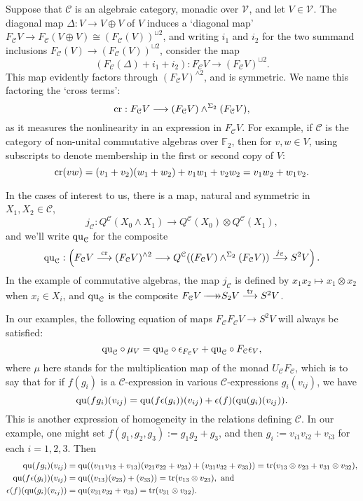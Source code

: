 \documentclass[11pt]{amsart}
\theoremstyle{plain}
\theoremstyle{definition}
\DeclareMathOperator{\trace}{tr}
\renewcommand{\to}{\longrightarrow}
\newcommand{\calC}{\mathcal{C}}
\newcommand{\calV}{\mathcal{V}}
\theoremstyle{plain}
\newcommand{\vect}[2]{\calV^{#1}_{#2}}
\newcommand{\quadratic}{\textup{qu}}
\newcommand{\crossterms}{\textup{cr}}
\newcommand{\epi}{{\,\makebox[0cm][l]{\ensuremath\to}\to}}
\newcommand{\F}{\mathbb{F}}
\begin{document}
\begin{Conventions and notation}
Suppose that $\calC$ is an algebraic category, monadic over $\vect{}{}$, and let $V\in\vect{}{}$. The diagonal map $\Delta:V\to V\oplus V$ of $V$ induces a `diagonal map' $F_\calC V\to F_\calC (V\oplus V)\cong (F_\calC (V))^{\sqcup 2}$, and writing $i_1$ and $i_2$ for the two summand inclusions $F_\calC (V)\to (F_\calC (V))^{\sqcup 2}$, consider the map
\[(F_\calC(\Delta)+i_1+i_2):F_\calC V\to (F_\calC V)^{\sqcup2}.\]
This map evidently factors through $(F_\calC V)^{\wedge 2}$, and is symmetric. We name this factoring the `cross terms':
\[\crossterms:F_\calC V\to (F_\calC V)\wedge^{\Sigma_2} (F_\calC V),\]
as it measures the nonlinearity in an expression in $F_\calC V$. For example, if $\calC$ is the category of non-unital commutative algebras over $\F_2$, then for $v,w\in V$, using subscripts to denote membership in the first or second copy of $V$:
\[\crossterms(vw)=(v_1+v_2)(w_1+w_2)+v_1w_1+v_2w_2=v_1w_2+w_1v_2.\]

In the cases of interest to us, there is a map, natural and symmetric in $X_1,X_2\in\calC$,
\[j_\calC:Q^\calC(X_0\wedge X_1)\to Q^\calC(X_0)\otimes Q^\calC(X_1),\]
and we'll write $\quadratic_\calC$ for the composite
\[\quadratic_\calC:\left(F_\calC V\overset{\crossterms}{\to}(F_\calC V)^{\wedge 2}\to Q^\calC((F_\calC V)\wedge^{\Sigma_2} (F_\calC V))\overset{j_\calC}{\to}S^2V\right).\]
In the example of commutative algebras, the map $j_\calC$ is defined by $x_1x_2\mapsto x_1\otimes x_2$ when $x_i\in X_i$, and $\quadratic_\calC$ is the composite $F_\calC V\epi S_2V\overset{\trace}{\to}S^2V$.

In our examples, the following equation of maps $F_\calC F_\calC V\to S^2 V$ will always be satisfied:
\[\quadratic_\calC\circ\mu_V=\quadratic_\calC\circ \epsilon_{F_\calC V} +\quadratic_\calC\circ {F_\calC \epsilon_V},\]
where $\mu$ here stands for the multiplication map of the monad $U_\calC F_\calC $, which is to say that for if  $f(g_i)$ is a $\calC$-expression in various $\calC$-expressions $g_i(v_{ij})$, we have 
\[\quadratic(fg_i)(v_{ij})=\quadratic(f\epsilon(g_i))(v_{ij})+\epsilon(f)(\quadratic(g_i)(v_{ij})).\]
This is another expression of homogeneity in the relations defining $\calC$. In our example, one might set $f(g_1,g_2,g_3):=g_1g_2+g_3$, and then $g_i:=v_{i1}v_{i2}+v_{i3}$ for each $i=1,2,3$. Then
{\small
\begin{alignat*}{2}
\quadratic(fg_i)(v_{ij})&=\quadratic((v_{11}v_{12}+v_{13})(v_{21}v_{22}+v_{23})+(v_{31}v_{32}+v_{33}))=\trace(v_{13}\otimes v_{23}+v_{31}\otimes v_{32}),\\
\quadratic(f\epsilon(g_i))(v_{ij})&=\quadratic((v_{13})(v_{23})+(v_{33}))=\trace(v_{13}\otimes v_{23}),\textup{ and}\\
\epsilon(f)(\quadratic(g_i)(v_{ij}))&=\quadratic(v_{31}v_{32}+v_{33})=\trace(v_{31}\otimes v_{32}).
\end{alignat*}
}



\end{Conventions and notation}
\end{document}
